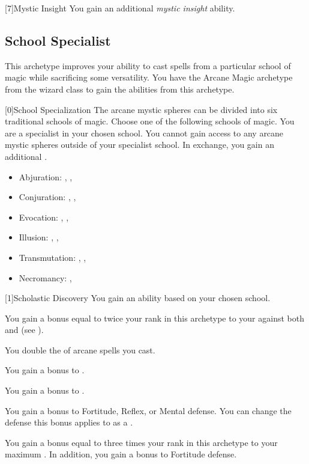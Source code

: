         [7]{Mystic Insight}
        You gain an additional \textit{mystic insight} ability.

    \newpage
    \subsection{School Specialist}
        This archetype improves your ability to cast spells from a particular school of magic while sacrificing some versatility.
        You have the Arcane Magic archetype from the wizard class to gain the abilities from this archetype.

        [0]{School Specialization} The arcane mystic spheres can be divided into six traditional schools of magic.
        Choose one of the following schools of magic.
        You are a specialist in your chosen school.
        You cannot gain access to any arcane mystic spheres outside of your specialist school.
        In exchange, you gain an additional .
        \begin{itemize}
            \item Abjuration: , , 
            \item Conjuration: , , 
            \item Evocation: , , 
            \item Illusion: , , 
            \item Transmutation: , , 
            \item Necromancy: , 
        \end{itemize}

        [1]{Scholastic Discovery} You gain an ability based on your chosen school.
        {
             You gain a bonus equal to twice your rank in this archetype to your  against both  and  (see ).

             You double the  of arcane spells you cast.

             You gain a  bonus to .

             You gain a  bonus to .

             You gain a  bonus to Fortitude, Reflex, or Mental defense.
            You can change the defense this bonus applies to as a .

             You gain a bonus equal to three times your rank in this archetype to your maximum .
            In addition, you gain a  bonus to Fortitude defense.
        }

